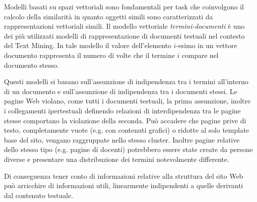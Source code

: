Modelli basati su spazi vettoriali sono fondamentali per task che coinvolgono il calcolo della similarità in quanto oggetti simili sono caratterizzati da rappresentazioni vettoriali simili. Il modello vettoriale \textit{termini-documenti} è uno dei più utilizzati modelli di rappresentazione di documenti testuali nel contesto del Text Mining. In tale modello il valore dell'elemento $i$-esimo in un vettore documento rappresenta il numero di volte che il termine $i$ compare nel documento stesso.

Questi modelli si basano sull'assunzione di indipendenza tra i termini all'interno di un documento e sull'assunzione di indipendenza tra i documenti stessi. Le pagine Web violano, come tutti i documenti testuali, la prima assunzione, inoltre i collegamenti ipertestuali definendo relazioni di interdipendenza tra le pagine stesse comportano la violazione della seconda. Può accadere che pagine prive di testo, completamente vuote (e.g. con contenuti grafici) o ridotte al solo template base del sito, vengano raggruppate nello stesso cluster. Inoltre pagine relative dello stesso tipo (e.g. pagine di docenti) potrebbero essere state create da persone diverse e presentare una distribuzione dei termini notevolmente differente. 

Di conseguenza tener conto di informazioni relative alla struttura del sito Web può arricchire di informazioni utili, linearmente indipendenti a quelle derivanti dal contenuto testuale.


